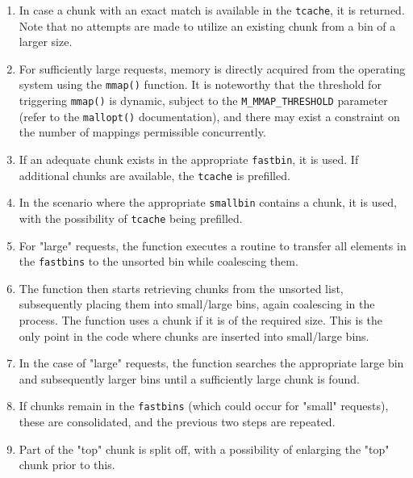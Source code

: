 \documentclass{article}
\begin{document}
\begin{enumerate}
  \item In case a chunk with an exact match is available in the \texttt{tcache}, it is returned. Note that no attempts are made to utilize an existing chunk from a bin of a larger size.

  \item For sufficiently large requests, memory is directly acquired from the operating system using the \texttt{mmap()} function. It is noteworthy that the threshold for triggering \texttt{mmap()} is dynamic, subject to the \texttt{M\_MMAP\_THRESHOLD} parameter (refer to the \texttt{mallopt()} documentation), and there may exist a constraint on the number of mappings permissible concurrently.

  \item If an adequate chunk exists in the appropriate \texttt{fastbin}, it is used. If additional chunks are available, the \texttt{tcache} is prefilled.

  \item In the scenario where the appropriate \texttt{smallbin} contains a chunk, it is used, with the possibility of \texttt{tcache} being prefilled.

  \item For "large" requests, the function executes a routine to transfer all elements in the \texttt{fastbins} to the unsorted bin while coalescing them.

  \item The function then starts retrieving chunks from the unsorted list, subsequently placing them into small/large bins, again coalescing in the process. The function uses a chunk if it is of the required size. This is the only point in the code where chunks are inserted into small/large bins.

  \item In the case of "large" requests, the function searches the appropriate large bin and subsequently larger bins until a sufficiently large chunk is found.

  \item If chunks remain in the \texttt{fastbins} (which could occur for "small" requests), these are consolidated, and the previous two steps are repeated.

  \item Part of the "top" chunk is split off, with a possibility of enlarging the "top" chunk prior to this.
\end{enumerate}
\end{document}
